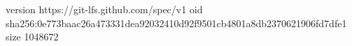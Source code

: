 version https://git-lfs.github.com/spec/v1
oid sha256:0e773baac26a473331dea92032410d92f9501cb4801a8db2370621906fd7dfe1
size 1048672
